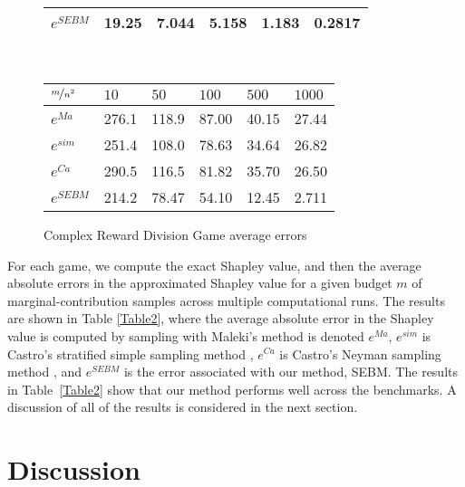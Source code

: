 \documentclass[]{interact}
\theoremstyle{plain}%
\theoremstyle{definition}
\theoremstyle{remark}
\begin{document}
\begin{table*}[h]
\begin{subfigure}[]{0.8\textwidth}
\begin{tabular}{llllll}
			$e^{SEBM}$  & 19.25 & 7.044 & 5.158 & 1.183 & 0.2817  \\
			\hline
			\end{tabular}
    \end{subfigure}
	\\\vspace{4mm}
    \begin{subfigure}[]{0.8\textwidth}
        \centering
        \caption{Complex Reward Division Game average errors}\label{tab4}
			\centering
			\begin{tabular}{llllll}
			\hline
			$\nicefrac{m}{n^2}$ & $10$ & $50$ & $100$ & $500$ & $1000$ \\
			\hline
			$e^{Ma}$   & 276.1 & 118.9 & 87.00 & 40.15 & 27.44 \\
			$e^{sim}$  & 251.4 & 108.0 & 78.63 & 34.64 & 26.82 \\
			$e^{Ca}$   & 290.5 & 116.5 & 81.82 & 35.70 & 26.50 \\
			$e^{SEBM}$ & 214.2 & 78.47 & 54.10 & 12.45 & 2.711  \\
			\hline
			\end{tabular}
    \end{subfigure}
    \vspace{3mm}
    \caption{Average absolute errors in the Shapley value calculation across all players in the four cooperative games (units in $10^{-4}$), for the different sampling schemes with different sampling budgets $m$ per number of strata (with $n^2=15^2$ for all).}
    \label{Table2}
\end{table*}


For each game, we compute the exact Shapley value, and then the average absolute errors in the approximated Shapley value for a given budget $m$ of marginal-contribution samples across multiple computational runs.
The results are shown in Table \ref{Table2}, 
where the average absolute error in the Shapley value is computed by sampling with Maleki's method \citep{2013arXiv1306.4265M} is denoted $e^{Ma}$, $e^{sim}$ is Castro's stratified simple sampling method \citep{DBLP:journals/cor/CastroGT09}, $e^{Ca}$ is Castro's Neyman sampling method \citep{CASTRO2017180}, and $e^{SEBM}$ is the error associated with our method, SEBM. 
The results in Table~\ref{Table2} show that our method performs well across the benchmarks. 
A discussion of all of the results is considered in the next section. 


\section{Discussion}
\label{sec:discussion}
\end{document}
